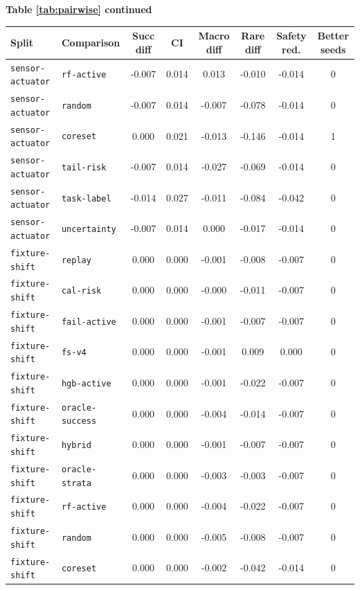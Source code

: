 \documentclass{article}
\begin{document}
\begin{center}
\textbf{Table \ref{tab:pairwise} continued}\\[0.4ex]
\begin{tabular}{llcccccc}
\toprule
Split & Comparison & Succ diff & CI & Macro diff & Rare diff & Safety red. & Better seeds \\
\midrule
\texttt{sensor-actuator} & \texttt{rf-active} & -0.007 & 0.014 & 0.013 & -0.010 & -0.014 & 0 \\
\texttt{sensor-actuator} & \texttt{random} & -0.007 & 0.014 & -0.007 & -0.078 & -0.014 & 0 \\
\texttt{sensor-actuator} & \texttt{coreset} & 0.000 & 0.021 & -0.013 & -0.146 & -0.014 & 1 \\
\texttt{sensor-actuator} & \texttt{tail-risk} & -0.007 & 0.014 & -0.027 & -0.069 & -0.014 & 0 \\
\texttt{sensor-actuator} & \texttt{task-label} & -0.014 & 0.027 & -0.011 & -0.084 & -0.042 & 0 \\
\texttt{sensor-actuator} & \texttt{uncertainty} & -0.007 & 0.014 & 0.000 & -0.017 & -0.014 & 0 \\
\texttt{fixture-shift} & \texttt{replay} & 0.000 & 0.000 & -0.001 & -0.008 & -0.007 & 0 \\
\texttt{fixture-shift} & \texttt{cal-risk} & 0.000 & 0.000 & -0.000 & -0.011 & -0.007 & 0 \\
\texttt{fixture-shift} & \texttt{fail-active} & 0.000 & 0.000 & -0.001 & -0.007 & -0.007 & 0 \\
\texttt{fixture-shift} & \texttt{fs-v4} & 0.000 & 0.000 & -0.001 & 0.009 & 0.000 & 0 \\
\texttt{fixture-shift} & \texttt{hgb-active} & 0.000 & 0.000 & -0.001 & -0.022 & -0.007 & 0 \\
\texttt{fixture-shift} & \texttt{oracle-success} & 0.000 & 0.000 & -0.004 & -0.014 & -0.007 & 0 \\
\texttt{fixture-shift} & \texttt{hybrid} & 0.000 & 0.000 & -0.001 & -0.007 & -0.007 & 0 \\
\texttt{fixture-shift} & \texttt{oracle-strata} & 0.000 & 0.000 & -0.003 & -0.003 & -0.007 & 0 \\
\texttt{fixture-shift} & \texttt{rf-active} & 0.000 & 0.000 & -0.004 & -0.022 & -0.007 & 0 \\
\texttt{fixture-shift} & \texttt{random} & 0.000 & 0.000 & -0.005 & -0.008 & -0.007 & 0 \\
\texttt{fixture-shift} & \texttt{coreset} & 0.000 & 0.000 & -0.002 & -0.042 & -0.014 & 0 \\

\end{tabular}
\end{center}
\end{document}
